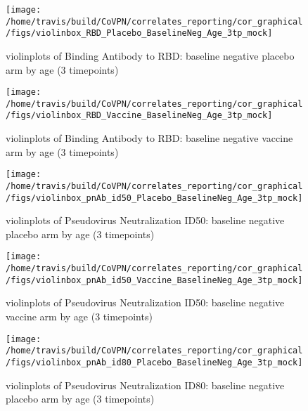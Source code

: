 \documentclass[]{book}
\theoremstyle{definition}
\theoremstyle{definition}
\theoremstyle{definition}
\newcommand{\1}{\mathbbm{1}}
\begin{document}
\clearpage
\begin{figure}[H]

{\centering \texttt{[image: /home/travis/build/CoVPN/correlates\_reporting/cor\_graphical/figs/violinbox\_RBD\_Placebo\_BaselineNeg\_Age\_3tp\_mock]} 

}

\caption{violinplots of Binding Antibody to RBD: baseline negative placebo arm by age (3 timepoints)}\label{fig:unnamed-chunk-85}
\end{figure}

\clearpage
\begin{figure}[H]

{\centering \texttt{[image: /home/travis/build/CoVPN/correlates\_reporting/cor\_graphical/figs/violinbox\_RBD\_Vaccine\_BaselineNeg\_Age\_3tp\_mock]} 

}

\caption{violinplots of Binding Antibody to RBD: baseline negative vaccine arm by age (3 timepoints)}\label{fig:unnamed-chunk-86}
\end{figure}

\clearpage
\begin{figure}[H]

{\centering \texttt{[image: /home/travis/build/CoVPN/correlates\_reporting/cor\_graphical/figs/violinbox\_pnAb\_id50\_Placebo\_BaselineNeg\_Age\_3tp\_mock]} 

}

\caption{violinplots of Pseudovirus Neutralization ID50: baseline negative placebo arm by age (3 timepoints)}\label{fig:unnamed-chunk-87}
\end{figure}

\clearpage
\begin{figure}[H]

{\centering \texttt{[image: /home/travis/build/CoVPN/correlates\_reporting/cor\_graphical/figs/violinbox\_pnAb\_id50\_Vaccine\_BaselineNeg\_Age\_3tp\_mock]} 

}

\caption{violinplots of Pseudovirus Neutralization ID50: baseline negative vaccine arm by age (3 timepoints)}\label{fig:unnamed-chunk-88}
\end{figure}

\clearpage
\begin{figure}[H]

{\centering \texttt{[image: /home/travis/build/CoVPN/correlates\_reporting/cor\_graphical/figs/violinbox\_pnAb\_id80\_Placebo\_BaselineNeg\_Age\_3tp\_mock]} 

}

\caption{violinplots of Pseudovirus Neutralization ID80: baseline negative placebo arm by age (3 timepoints)}\label{fig:unnamed-chunk-89}
\end{figure}
\end{document}
